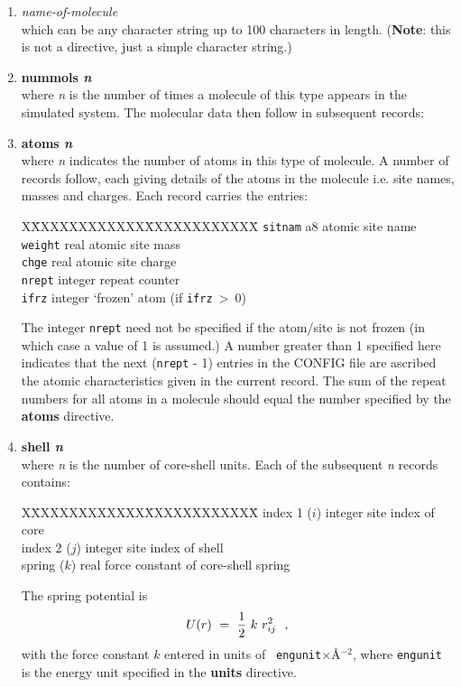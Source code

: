 \begin{enumerate}

\item {\em name-of-molecule} \\
which can be any character string up to 100 characters in length.
({\bf Note}: this is not a directive, just a simple character string.)

\item {\bf nummols {\em n}} \\
where {\em n} is the number of times a molecule of this type
appears in the simulated system.  The molecular data then follow
in subsequent records:

\item {\bf atoms {\em n}} \\
where {\em n} indicates the number of atoms in this type of
molecule.  A number of records follow, each giving details of the
atoms in the molecule i.e. site names, masses and charges.  Each
record carries the entries:
\begin{tabbing}
X\=XXXXXXXXXXXX\=XXXXXXXXXXXX\=\kill
\> {\tt sitnam} \> a8      \> atomic site name \\
\> {\tt weight} \> real    \> atomic site mass \\
\> {\tt chge}   \> real    \> atomic site charge \\
\> {\tt nrept}  \> integer \> repeat counter \\
\> {\tt ifrz}   \> integer \> `frozen' atom (if {\tt ifrz}$~>~0$)
\end{tabbing}
The integer {\tt nrept} need not be specified if the atom/site is
not frozen (in which case a value of 1 is assumed.)  A number
greater than 1 specified here indicates that the next ({\tt nrept}
- 1) entries in the CONFIG file are ascribed the atomic
characteristics given in the current record.  The sum of the
repeat numbers for all atoms in a molecule should equal the number
specified by the {\bf atoms} directive.

\item{\bf shell {\em n}} \\
where {\em n} is the number of core-shell units.  Each of the
subsequent {\em n} records contains:
\begin{tabbing}
X\=XXXXXXXXXXXX\=XXXXXXXXXXXX\=\kill
\> index 1 ($i$) \> integer \> site index of core \\
\> index 2 ($j$) \> integer \> site index of shell \\
\> spring  ($k$) \> real    \> force constant of core-shell spring
\end{tabbing}
The spring potential is
\begin{equation}
U(r)~=~{1 \over 2}~k~r_{ij}^{2}~~,
\end{equation}
with the force constant $k$ entered in units of {\tt
engunit}$\times$\AA$^{-2}$, where {\tt engunit} is the energy unit
specified in the {\bf units} directive.


\end{enumerate}
